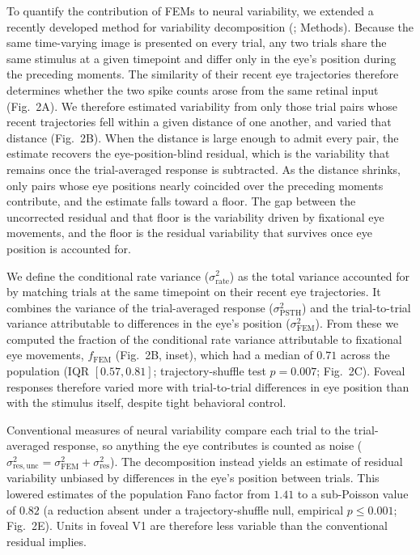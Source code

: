 \documentclass{lite}
\begin{document}
To quantify the contribution of FEMs to neural variability, we extended a recently developed method for variability decomposition (\cite{mcfarland2016variability}; Methods). Because the same time-varying image is presented on every trial, any two trials share the same stimulus at a given timepoint and differ only in the eye's position during the preceding moments. The similarity of their recent eye trajectories therefore determines whether the two spike counts arose from the same retinal input (Fig.~2A). We therefore estimated variability from only those trial pairs whose recent trajectories fell within a given distance of one another, and varied that distance (Fig.~2B). When the distance is large enough to admit every pair, the estimate recovers the eye-position-blind residual, which is the variability that remains once the trial-averaged response is subtracted. As the distance shrinks, only pairs whose eye positions nearly coincided over the preceding moments contribute, and the estimate falls toward a floor. The gap between the uncorrected residual and that floor is the variability driven by fixational eye movements, and the floor is the residual variability that survives once eye position is accounted for.

We define the conditional rate variance ($\sigma^2_{\text{rate}}$) as the total variance accounted for by matching trials at the same timepoint on their recent eye trajectories. It combines the variance of the trial-averaged response ($\sigma^2_{\text{PSTH}}$) and the trial-to-trial variance attributable to differences in the eye's position ($\sigma^2_{\text{FEM}}$). 
From these we computed the fraction of the conditional rate variance attributable to fixational eye movements, $f_{\text{FEM}}$ (Fig.~2B, inset), which had a median of $0.71$ across the population (IQR $[0.57, 0.81]$; trajectory-shuffle test $p = 0.007$; Fig.~2C). Foveal responses therefore varied more with trial-to-trial differences in eye position than with the stimulus itself, despite tight behavioral control. 

Conventional measures of neural variability compare each trial to the trial-averaged response, so anything the eye contributes is counted as noise ($\sigma^{2}_{\text{res},\mathrm{unc}} = \sigma^2_{\text{FEM}} + \sigma^2_{\text{res}}$). The decomposition instead yields an estimate of residual variability unbiased by differences in the eye's position between trials. This lowered estimates of the population Fano factor from $1.41$ to a sub-Poisson value of $0.82$ (a reduction absent under a trajectory-shuffle null, empirical $p \leq 0.001$; Fig.~2E). Units in foveal V1 are therefore less variable than the conventional residual implies.
\end{document}
